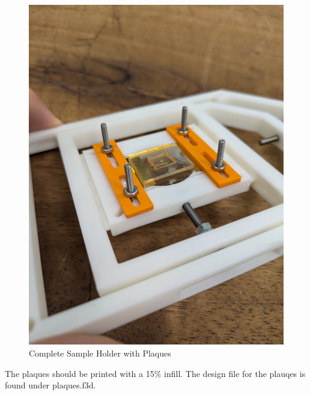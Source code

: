 \documentclass[runningheads]{llncs}
\begin{document}
\begin{figure}[h]
\begin{minipage}[b]{0.45\textwidth}
    \includegraphics[width=\linewidth]{images/slide_holder_complete1.jpg}
    \end{minipage}
    \caption{Complete Sample Holder with Plaques}
\end{figure}


The plaques should be printed with a 15\% infill. The design file for the plauqes is found under plaques.f3d. 
\end{document}
